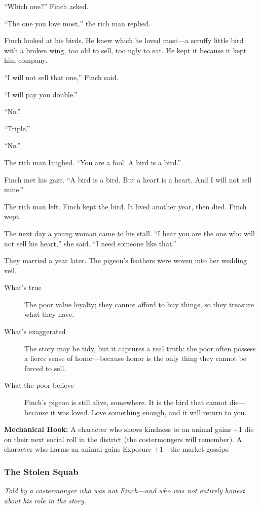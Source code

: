 \documentclass[11pt]{article}
\begin{document}
“Which one?” Finch asked.

“The one you love most,” the rich man replied.

Finch looked at his birds. He knew which he loved most—a scruffy little bird with a broken wing, too old to sell, too ugly to eat. He kept it because it kept him company.

“I will not sell that one,” Finch said.

“I will pay you double.”

“No.”

“Triple.”

“No.”

The rich man laughed. “You are a fool. A bird is a bird.”

Finch met his gaze. “A bird is a bird. But a heart is a heart. And I will not sell mine.”

The rich man left. Finch kept the bird. It lived another year, then died. Finch wept.

The next day a young woman came to his stall. “I hear you are the one who will not sell his heart,” she said. “I need someone like that.”

They married a year later. The pigeon’s feathers were woven into her wedding veil.

\begin{description}
\item[What's true] The poor value loyalty; they cannot afford to buy things, so they treasure what they have.
\item[What's exaggerated] The story may be tidy, but it captures a real truth: the poor often possess a fierce sense of honor—because honor is the only thing they cannot be forced to sell.
\item[What the poor believe] Finch’s pigeon is still alive, somewhere. It is the bird that cannot die—because it was loved. Love something enough, and it will return to you.
\end{description}

\textbf{Mechanical Hook:} A character who shows kindness to an animal gains +1 die on their next social roll in the district (the costermongers will remember). A character who harms an animal gains Exposure +1—the market gossips.

\subsubsection{The Stolen Squab}
\textit{Told by a costermonger who was not Finch—and who was not entirely honest about his role in the story.}
\end{document}
